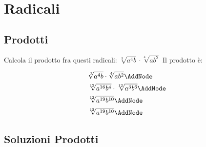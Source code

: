 \chapter{Radicali}
\section{Prodotti}
\tcbstartrecording

\begin{exercise}
	Calcola il prodotto fra questi radicali:
	$\sqrt[3]{a^4b}\cdot\sqrt[4]{ab^2}$
	\tcblower
	Il prodotto è:
\begin{NodesList}
	\begin{align*}
		&\sqrt[3]{a^4b}\cdot\sqrt[4]{ab^2}\AddNode\\
		&\sqrt[12]{a^{16}b^4}\cdot\sqrt[12]{a^3b^6}\AddNode\\
		&\sqrt[12]{a^{19}b^{10}}\AddNode\\
		&\sqrt[12]{a^{19}b^{10}}\AddNode\\
	\end{align*}
			
						\end{NodesList}
\end{exercise}


\tcbstoprecording
\newpage
\section{Soluzioni Prodotti}
\tcbinputrecords
\newpage
